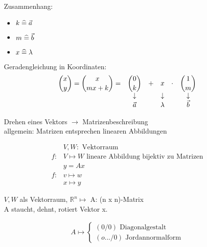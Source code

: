 %
Zusammenhang:
%
\begin{itemize}
	\item $k \mathrel{\widehat{=}} \vec{a}$
	\item $m \mathrel{\widehat{=}} \vec{b}$
	\item $x \mathrel{\widehat{=}} \lambda$
\end{itemize}
%
Geradengleichung in Koordinaten:
\begin{equation*}
  \begin{matrix}
    \displaystyle\binom{x}{y} = \binom{x}{mx+k} = & \displaystyle\binom{0}{k} & + & \displaystyle x      & \cdot & \displaystyle\binom{1}{m} \\
                                        &    \downarrow   &   & \downarrow &       & \downarrow \\
                                        &    \vec{a}      &   & \lambda    &       & \vec{b}
  \end{matrix}
\end{equation*}

% 
% 



\noindent Drehen eines Vektors $\longrightarrow$ Matrizenbeschreibung \\
allgemein: Matrizen entsprechen linearen Abbildungen

\begin{align*}
&V, W: \text{ Vektorraum} \\
f: &V \mapsto W  \text{ lineare Abbildung bijektiv zu Matrizen} \\
&y = Ax \\
f: &v \mapsto w \\
&x \mapsto y
\end{align*}

$V, W$ als Vektorraum, $\mathbb{R}^{n} \mapsto$ A: (n x n)-Matrix \\
A staucht, dehnt, rotiert Vektor x.

\begin{align*}
A \mapsto 	\begin{cases} 
			(0 / 0) \text{ Diagonalgestalt} \\
			(o.../0) \text{ Jordannormalform}
		\end{cases}
\end{align*}

